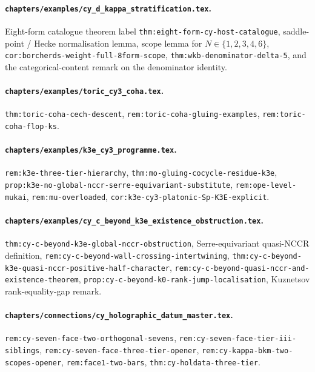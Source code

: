 \paragraph{\texttt{chapters/examples/cy\_d\_kappa\_stratification.tex}.}
Eight-form catalogue theorem label
\texttt{thm:eight-form-cy-host-catalogue},
saddle-point / Hecke normalisation lemma,
scope lemma for $N \in \{1,2,3,4,6\}$,
\texttt{cor:borcherds-weight-full-8form-scope},
\texttt{thm:wkb-denominator-delta-5}, and the categorical-content
remark on the denominator identity.

\paragraph{\texttt{chapters/examples/toric\_cy3\_coha.tex}.}
\texttt{thm:toric-coha-cech-descent},
\texttt{rem:toric-coha-gluing-examples},
\texttt{rem:toric-coha-flop-ks}.

\paragraph{\texttt{chapters/examples/k3e\_cy3\_programme.tex}.}
\texttt{rem:k3e-three-tier-hierarchy},
\texttt{thm:mo-gluing-cocycle-residue-k3e},
\texttt{prop:k3e-no-global-nccr-serre-equivariant-substitute},
\texttt{rem:ope-level-mukai}, \texttt{rem:mu-overloaded},
\texttt{cor:k3e-cy3-platonic-Sp-K3E-explicit}.

\paragraph{\texttt{chapters/examples/cy\_c\_beyond\_k3e\_existence\_obstruction.tex}.}
\texttt{thm:cy-c-beyond-k3e-global-nccr-obstruction}, Serre-equivariant
quasi-NCCR definition,
\texttt{rem:cy-c-beyond-wall-crossing-intertwining},
\texttt{thm:cy-c-beyond-k3e-quasi-nccr-positive-half-character},
\texttt{rem:cy-c-beyond-quasi-nccr-and-existence-theorem},
\texttt{prop:cy-c-beyond-k0-rank-jump-localisation},
Kuznetsov rank-equality-gap remark.

\paragraph{\texttt{chapters/connections/cy\_holographic\_datum\_master.tex}.}
\texttt{rem:cy-seven-face-two-orthogonal-sevens},
\texttt{rem:cy-seven-face-tier-iii-siblings},
\texttt{rem:cy-seven-face-three-tier-opener},
\texttt{rem:cy-kappa-bkm-two-scopes-opener},
\texttt{rem:face1-two-bars},
\texttt{thm:cy-holdata-three-tier}.

